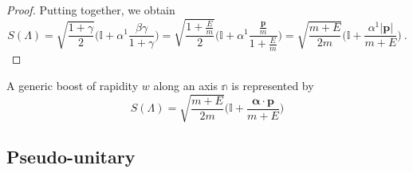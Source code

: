 \begin{example}
\begin{proof}
            Putting together, we obtain 
            \begin{equation*}
                S(\Lambda) = \sqrt{\frac{1 + \gamma}{2}} \Big ( \mathbb I + \alpha^1 \frac{\beta \gamma}{1 + \gamma}\Big) = \sqrt{\frac{1 + \frac{E}{m}}{2}} \Big ( \mathbb I + \alpha^1  \frac{\frac{\mathbf p}{m}}{1 + \frac{E}{m}}\Big) = \sqrt{\frac{m + E}{2m}} \Big ( \mathbb I + \frac{\alpha^1 |\mathbf p|}{m + E}\Big) ~.
            \end{equation*}
        \end{proof}
    \end{example}

    \begin{example}
        A generic boost of rapidity $w$ along an axis $\mathbb n$ is represented by 
        \begin{equation*}\label{genlorspi}
            S(\Lambda) = \sqrt{\frac{m + E}{2m}} \Big ( \mathbb I + \frac{\boldsymbol \alpha \cdot \mathbf p}{m + E}\Big)
        \end{equation*}
    \end{example}

\subsection{Pseudo-unitary}


